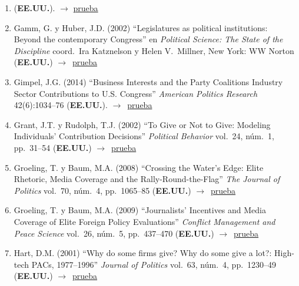 \documentclass[12 pt, letter]{article}
\newenvironment{CitasMiTrabajo}{
    \begin{footnotesize}
    \begin{enumerate}[label={\footnotesize\emph{cita~\arabic*}},ref=\arabic*] %
        \setlength{\itemsep}{.1\itemsep}
        \setlength{\parskip}{.1\parskip}
    }{\end{enumerate}\end{footnotesize}}
\begin{document}
\begin{CitasMiTrabajo}
       \item {} (\textbf{EE.UU.}).  $\rightarrow$ \href{https://doi.org/10.1177/2053168019877039}{prueba}

        \item Gamm, G. y  Huber, J.D. (2002)
        ``Legislatures as political
        institutions: Beyond the contemporary Congress'' en \emph{Political
        Science: The State of the Discipline} coord.\ Ira Katznelson y Helen
        V.\ Millner, New York: WW Norton  (\textbf{EE.UU.}) $\rightarrow$~\href{https://github.com/emagar/cv/blob/master/citasMiTrab/coxMagar/gamm.pdf}{prueba}

        \item Gimpel, J.G. (2014) ``Business Interests and the Party Coalitions Industry Sector Contributions to U.S. Congress'' \emph{American Politics Research} 42(6):1034--76 (\textbf{EE.UU.}). $\rightarrow$~\href{https://github.com/emagar/cv/blob/master/citasMiTrab/coxMagar/gimpel.etalBusPacs2014apr.pdf}{prueba}

        \item Grant, J.T. y Rudolph, T.J. (2002)
        ``To Give or Not to Give: Modeling Individuals' Contribution Decisions''
        \emph{Political Behavior} vol.\ 24, n\'um.\ 1, pp.\ 31--54 (\textbf{EE.UU.}) $\rightarrow$~\href{https://github.com/emagar/cv/blob/master/citasMiTrab/coxMagar/grant.pdf}{prueba}

        \item Groeling, T. y Baum, M.A. (2008)
        ``Crossing the Water's Edge: Elite Rhetoric,
        Media Coverage and the Rally-Round-the-Flag'' \emph{The Journal of Politics} vol.\ 70,
        n\'um.\ 4, pp.\ 1065--85 (\textbf{EE.UU.}) $\rightarrow$~\href{https://github.com/emagar/cv/blob/master/citasMiTrab/coxMagar/groe.pdf}{prueba}

        \item Groeling, T. y Baum, M.A. (2009) ``Journalists' Incentives and Media Coverage of Elite Foreign Policy Evaluations''
            \emph{Conflict Management and Peace Science} vol.\ 26, n\'um.\ 5, pp.\ 437--470 (\textbf{EE.UU.}) $\rightarrow$~\href{https://github.com/emagar/cv/blob/master/citasMiTrab/coxMagar/groeling+baumJournalists2009.pdf}{prueba}

        \item Hart, D.M. (2001)
        ``Why do some firms give? Why do some give a lot?: High-tech PACs, 1977--1996'' \emph{Journal of Politics} vol.\ 63, n\'um.\ 4, pp.\ 1230--49
        (\textbf{EE.UU.}) $\rightarrow$~\href{https://github.com/emagar/cv/blob/master/citasMiTrab/coxMagar/hart.pdf}{prueba}


\end{CitasMiTrabajo}
\end{document}
